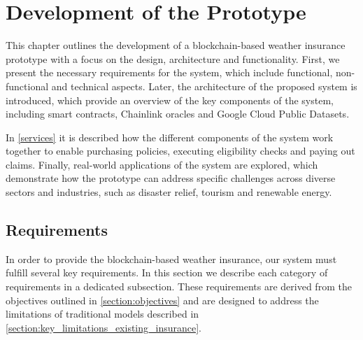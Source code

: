 \chapter{Development of the Prototype}\label{chapter:development_prototype}
This chapter outlines the development of a blockchain-based weather insurance prototype with a focus on the design, architecture and functionality. First, we present the necessary requirements for the system, which include functional, non-functional and technical aspects. Later, the architecture of the proposed system is introduced, which provide an overview of the key components of the system, including smart contracts, Chainlink oracles and Google Cloud Public Datasets.

In \cref{services} it is described how the different components of the system work together to enable purchasing policies, executing eligibility checks and paying out claims. Finally, real-world applications of the system are explored, which demonstrate how the prototype can address specific challenges across diverse sectors and industries, such as disaster relief, tourism and renewable energy.

\section{Requirements}\label{section:requirements}
In order to provide the blockchain-based weather insurance, our system must fulfill several key requirements. In this section we describe each category of requirements in a dedicated subsection. These requirements are derived from the objectives outlined in \cref{section:objectives} and are designed to address the limitations of traditional models described in \cref{section:key_limitations_existing_insurance}.

